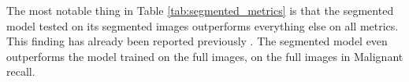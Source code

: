 The most notable thing in Table \ref{tab:segmented_metrics} is that the segmented model tested
on its segmented images outperforms everything else on all metrics.
This finding has already been reported previously \cite{segmenting-improves-performance}.
The segmented model even outperforms the model trained on the full images, on the full images in Malignant recall.
